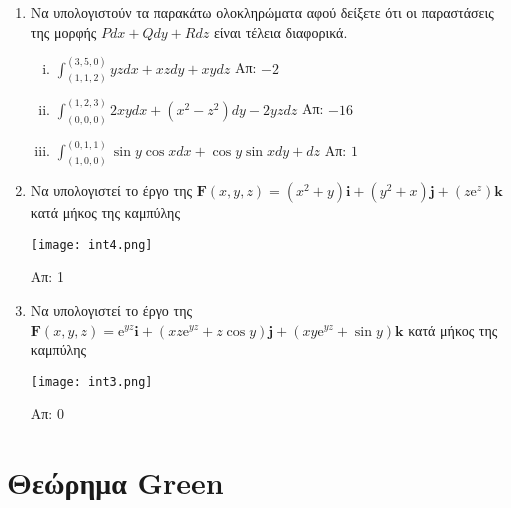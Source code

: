 \begin{enumerate}
  \item Να υπολογιστούν τα παρακάτω ολοκληρώματα αφού δείξετε ότι οι παραστάσεις της
    μορφής $ P dx + Q dy + R dz $ είναι τέλεια διαφορικά.
    \begin{enumerate}[i)]
      \item $ \int _{(1,1,2)}^{(3,5,0)} yz dx + xz dy + xy dz $ 
        \hfill Απ: $ -2 $ 
      \item $ \int _{(0,0,0)}^{(1,2,3)} 2xy dx + (x^{2}-z^{2}) dy -2yzdz $ 
        \hfill Απ: $ -16 $ 
      \item $ \int _{(1,0,0)}^{(0,1,1)} \sin{y} \cos{x} dx + \cos{y} \sin{x} dy + dz $ 
        \hfill Απ: $1$ 
    \end{enumerate}

  \item Να υπολογιστεί το έργο της $ \mathbf{F}(x,y,z) = (x^{2}+y) \mathbf{i} +
    (y^{2}+x) \mathbf{j} + (z \mathrm{e}^{z}) \mathbf{k} $ κατά μήκος της καμπύλης

    \texttt{[image: int4.png]}

    \hfill Απ: 1 

  \item Να υπολογιστεί το έργο της $ \mathbf{F}(x,y,z) = \mathrm{e}^{yz} \mathbf{i} +
    (xz \mathrm{e}^{yz} + z \cos{y}) \mathbf{j} + (xy \mathrm{e}^{yz} + \sin{y}) \mathbf{k} $ κατά μήκος της καμπύλης

    \texttt{[image: int3.png]}

    \hfill Απ: 0 
\end{enumerate}


\section*{Θεώρημα Green}


